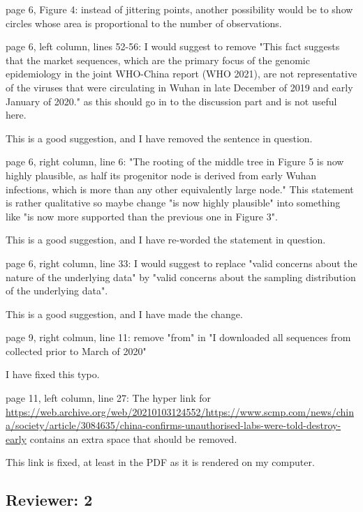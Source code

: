 \documentclass[11pt, oneside]{article}   	%
\newcommand{\response}[1]{{\color{black}#1}}
\begin{document}
page 6, Figure 4: instead of jittering points, another possibility would be to show circles whose area is proportional to the number of observations.

page 6, left column, lines 52-56: I would suggest to remove "This fact suggests that the market sequences, which are the primary focus of the genomic epidemiology in the joint WHO-China report (WHO 2021), are not representative of the viruses that were circulating in Wuhan in late December of 2019 and early January of 2020." as this should go in to the discussion part and is not useful here.

\response{This is a good suggestion, and I have removed the sentence in question.}

page 6, right column, line 6: "The rooting of the middle tree in Figure 5 is now highly plausible, as half its progenitor node is derived from early Wuhan infections, which is more than any other equivalently large node." This statement is rather qualitative so maybe change  "is now highly plausible" into something like "is now more supported than the previous one in Figure 3".

\response{This is a good suggestion, and I have re-worded the statement in question.}

page 6, right column, line 33: I would suggest to replace "valid concerns about the nature of the underlying data" by "valid concerns about the sampling distribution of the underlying data".

\response{This is a good suggestion, and I have made the change.}

page 9, right colmun, line 11: remove "from" in "I downloaded all sequences from collected prior to March of 2020"

\response{I have fixed this typo.}

page 11, left column, line 27: The hyper link for \url{https://web.archive.org/web/20210103124552/https://www.scmp.com/news/china/society/article/3084635/china-confirms-unauthorised-labs-were-told-destroy-early}  contains an extra space that should be removed.

\response{This link is fixed, at least in the PDF as it is rendered on my computer.}


\subsection*{Reviewer: 2}
\end{document}
